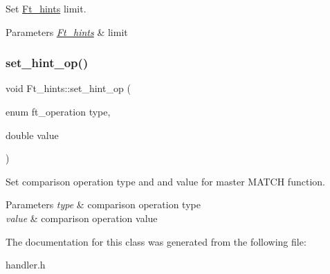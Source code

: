 Set \mbox{\hyperlink{classFt__hints}{Ft\+\_\+hints}} limit.


\begin{DoxyParams}{Parameters}
{\em \mbox{\hyperlink{classFt__hints}{Ft\+\_\+hints}}} & limit \\
\hline
\end{DoxyParams}
\mbox{\label{classFt__hints_aa8807f96c74757666f35c315330cb28c}} 
\subsubsection{\texorpdfstring{set\+\_\+hint\+\_\+op()}{set\_hint\_op()}}
{\footnotesize\ttfamily void Ft\+\_\+hints\+::set\+\_\+hint\+\_\+op (\begin{DoxyParamCaption}\item[{enum ft\+\_\+operation}]{type,  }\item[{double}]{value }\end{DoxyParamCaption})\hspace{0.3cm}{\ttfamily [inline]}}

Set comparison operation type and and value for master M\+A\+T\+CH function.


\begin{DoxyParams}{Parameters}
{\em type} & comparison operation type \\
\hline
{\em value} & comparison operation value \\
\hline
\end{DoxyParams}


The documentation for this class was generated from the following file\+:\begin{DoxyCompactItemize}
\item 
handler.\+h\end{DoxyCompactItemize}
